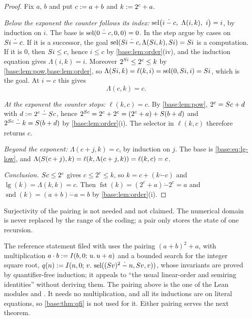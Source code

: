 \begin{proof}
Fix $a$, $b$ and put $c\mathrel{:=} a+b$ and $k\mathrel{:=} 2^{c}+a$.

\emph{Below the exponent the counter follows its index:}
$\sel\bigl(i\mathbin{\dot-}c,\ \Lambda(i,k),\ i\bigr)=i$, by induction on
$i$.  The base is $\operatorname{sel}(0\mathbin{\dot-}c,0,0)=0$.  In the step argue by
cases on $S i\mathbin{\dot-}c$.  If it is a successor, the goal
$\operatorname{sel}(S i\mathbin{\dot-}c,\Lambda(S i,k),S i)=S i$ is a
computation.  If it is $0$, then $S i\le c$, hence $i\le c$ by
\cref{base:lem:order}(iv), and the induction equation gives
$\Lambda(i,k)=i$.  Moreover $2^{S i}\le 2^{c}\le k$ by
\cref{base:lem:pow,base:lem:order}, so
$\Lambda(S i,k)=\ell(k,i)=\operatorname{sel}(0,S i,i)=S i$, which is the goal.
At $i=c$ this gives
\begin{equation}
 \Lambda(c,k)=c. \label{base:eq:lg-low}
\end{equation}

\emph{At the exponent the counter stops:} $\ell(k,c)=c$.  By
\cref{base:lem:pow}, $2^{c}=S c+d$ with
$d\mathrel{:=} 2^{c}\mathbin{\dot-}S c$, hence
$2^{S c}=2^{c}+2^{c}=(2^{c}+a)+S(b+d)$ and
$2^{S c}\mathbin{\dot-}k=S(b+d)$ by \cref{base:lem:order}(i).  The
selector in $\ell(k,c)$ therefore returns $c$.

\emph{Beyond the exponent:} $\Lambda(c+j,k)=c$, by induction on $j$.  The
base is \eqref{base:eq:lg-low}, and
$\Lambda(S(c+j),k)=\ell(k,\Lambda(c+j,k))=\ell(k,c)=c$.

\emph{Conclusion.}  $S c\le 2^{c}$ gives $c\le 2^{c}\le k$, so
$k=c+(k\mathbin{\dot-}c)$ and $\lg(k)=\Lambda(k,k)=c$.  Then
$\operatorname{fst}(k)=(2^{c}+a)\mathbin{\dot-}2^{c}=a$ and
$\operatorname{snd}(k)=(a+b)\mathbin{\dot-}a=b$ by
\cref{base:lem:order}(i).
\end{proof}

Surjectivity of the pairing is not needed and not claimed.  The numerical
domain is never replaced by the range of the coding; a pair only stores the
state of one recursion.

\begin{remark}
\label{base:rem:sqrtpair}
The reference statement filed with  uses the pairing
$(a+b)^{2}+a$, with multiplication $a\cdot b\mathrel{:=}I(b,0;\,u.\,u+a)$ and a
bounded search for the integer square root,
$q(n)\mathrel{:=}I(n,0;\,v.\,\operatorname{sel}((S v)^{2}\mathbin{\dot-}n,S v,v))$, whose
invariants are proved by quantifier-free induction; it appeals to ``the
usual linear-order and semiring identities'' without deriving them.  The
pairing above is the one of the Lean modules  and
.  It needs no multiplication, and all its inductions are on
literal equations, so \cref{base:thm:qfi} is not used for it.  Either
pairing serves the next theorem.
\end{remark}

